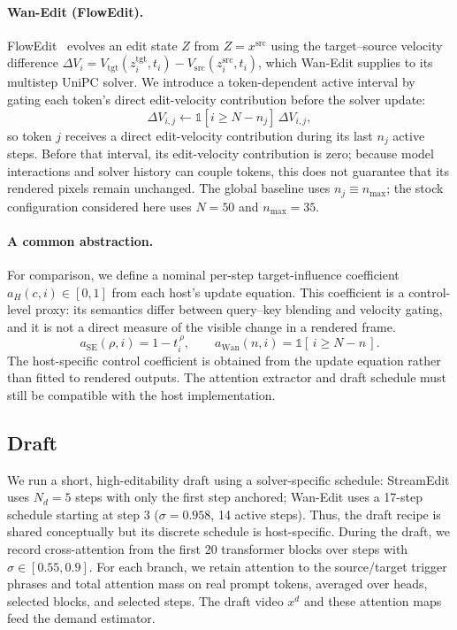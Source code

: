 \documentclass[10pt,twocolumn]{article}
\newcommand{\src}{\mathrm{src}}
\newcommand{\tgt}{\mathrm{tgt}}
\begin{document}
\paragraph{Wan-Edit (FlowEdit).}
FlowEdit~\cite{flowedit2025} evolves an edit state $Z$ from $Z=x^{\src}$ using the target--source velocity difference $\Delta V_i=V_{\tgt}(z_i^{\tgt},t_i)-V_{\src}(z_i^{\src},t_i)$, which Wan-Edit supplies to its multistep UniPC solver. We introduce a token-dependent active interval by gating each token's direct edit-velocity contribution before the solver update:
\begin{equation}
\Delta V_{i,j} \leftarrow \mathbb{1}\!\left[i \ge N - n_j\right]\,\Delta V_{i,j},
\label{eq:wan-gate}
\end{equation}
so token $j$ receives a direct edit-velocity contribution during its last $n_j$ active steps. Before that interval, its edit-velocity contribution is zero; because model interactions and solver history can couple tokens, this does not guarantee that its rendered pixels remain unchanged. The global baseline uses $n_j\equiv n_{\max}$; the stock configuration considered here uses $N=50$ and $n_{\max}=35$.

\paragraph{A common abstraction.}
For comparison, we define a nominal per-step target-influence coefficient $a_H(c,i)\in[0,1]$ from each host's update equation. This coefficient is a control-level proxy: its semantics differ between query--key blending and velocity gating, and it is not a direct measure of the visible change in a rendered frame.
\begin{equation}
a_{\mathrm{SE}}(\rho,i) = 1 - t_i^{\,\rho}, \qquad a_{\mathrm{Wan}}(n,i) = \mathbb{1}[\,i \ge N-n\,].
\label{eq:coef}
\end{equation}
The host-specific control coefficient is obtained from the update equation rather than fitted to rendered outputs. The attention extractor and draft schedule must still be compatible with the host implementation.

\subsection{Draft}
\label{sec:draft}
We run a short, high-editability draft using a solver-specific schedule: StreamEdit uses $N_d=5$ steps with only the first step anchored; Wan-Edit uses a 17-step schedule starting at step 3 ($\sigma=0.958$, 14 active steps). Thus, the draft recipe is shared conceptually but its discrete schedule is host-specific. During the draft, we record cross-attention from the first 20 transformer blocks over steps with $\sigma\in[0.55,0.9]$. For each branch, we retain attention to the source/target trigger phrases and total attention mass on real prompt tokens, averaged over heads, selected blocks, and selected steps. The draft video $x^d$ and these attention maps feed the demand estimator.
\end{document}
